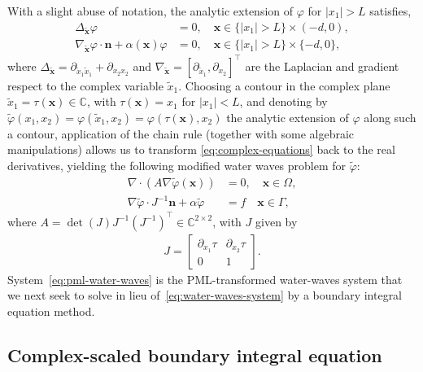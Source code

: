 \documentclass[11pt]{article}
\newcommand{\C}{\mathbb{C}}
\newcommand{\bn}{\mathbf{n}}
\newcommand{\bx}{\mathbf{x}}
\newcommand{\tvarphi}{\tilde \varphi}
\begin{document}
With a slight abuse of notation, the analytic extension of $\varphi$ for $|x_1|
> L$ satisfies, 
\begin{subequations}
  \label{eq:complex-equations}  
  \begin{align}  
      \label{eq:pml-laplace-equation}
      \Delta_{\tilde{\bx}} \varphi &=0, \quad \bx \in \{|x_1| > L \} \times (-d,0),\\
      \label{eq:pml-bc1} 
      \nabla_{\tilde{\bx}} \varphi \cdot \bn + \alpha(\bx) \varphi &=0, \quad \bx \in \{|x_1| > L \} \times \{-d,0\},
  \end{align}
\end{subequations}
where $\Delta_{\tilde{\bx}} = \partial_{\tilde{x}_1 \tilde{x}_1} + \partial_{x_2
x_2}$ and $\nabla_{\tilde{\bx}} = \left[\partial_{\tilde{x}_1},\partial_{x_2}
\right]^\top$ are the Laplacian and gradient respect to the complex variable
$\tilde{x}_1$. Choosing a contour in the complex plane $\tilde{x}_1 = \tau(\bx)
\in \C$, with $\tau(\bx) = x_1$ for $|x_1| < L$, and denoting by
$\tvarphi(x_1,x_2) = \varphi(\tilde{x}_1,x_2) = \varphi(\tau(\bx),x_2)$ the
analytic extension of $\varphi$ along such a contour, application of the chain
rule (together with some algebraic manipulations) allows us to transform
\cref{eq:complex-equations} back to the real derivatives, yielding the following
modified water waves problem for $\tilde{\varphi}$:
\begin{subequations}
  \label{eq:pml-water-waves}  
  \begin{align}
      \label{eq:pml-laplace-real}
      \nabla \cdot \left( A \nabla \tvarphi(\bx) \right) &= 0, \quad \bx \in \Omega,\\
      \label{eq:pml-bc-real} 
      \nabla \tvarphi \cdot J^{-1}\bn + \alpha \tvarphi &= f \quad \bx \in \Gamma,
  \end{align}
\end{subequations}
where $A = \det(J)J^{-1}(J^{-1})^\top \in \C^{2 \times 2}$, with $J$ given by
\begin{align}
  J =   
  \begin{bmatrix}
    \partial_{x_1} \tau & \partial_{x_2} \tau\\
    0 & 1
  \end{bmatrix}.
\end{align}
System~\cref{eq:pml-water-waves} is the PML-transformed water-waves system that
we next seek to solve in lieu of~\cref{eq:water-waves-system} by a boundary
integral equation method. 

\subsection{Complex-scaled boundary integral equation}\label{sec:complex-scaled-bie}
\end{document}
